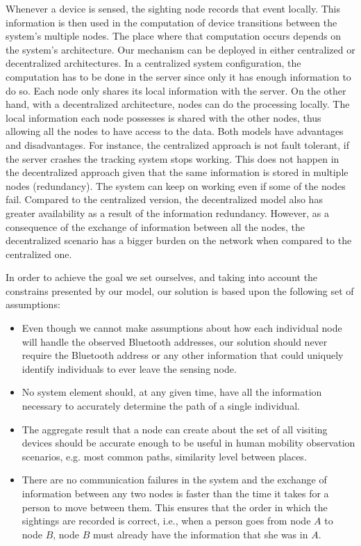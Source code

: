 Whenever a device is sensed, the sighting node records that event
locally. This information is then used in the computation of device
transitions between the system's multiple nodes. The place where that
computation occurs depends on the system's architecture. Our mechanism
can be deployed in either centralized or decentralized
architectures. In a centralized system configuration, the computation
has to be done in the server since only it has enough information to
do so. Each node only shares its local information with the server. On
the other hand, with a decentralized architecture, nodes can do the
processing locally. The local information each node possesses is
shared with the other nodes, thus allowing all the nodes to have
access to the data. Both models have advantages and
disadvantages. For instance, the centralized approach is not fault
tolerant, if the server crashes the tracking system stops
working. This does not happen in the decentralized approach given that
the same information is stored in multiple nodes (redundancy). The
system can keep on working even if some of the nodes fail. Compared to
the centralized version, the decentralized model also has greater
availability as a result of the information redundancy. However, as a
consequence of the exchange of information between all the nodes, the
decentralized scenario has a bigger burden on the network when
compared to the centralized one.


In order to achieve the goal we set ourselves, and taking into account
the constrains presented by our model, our solution is based upon the
following set of assumptions:
\begin{itemize}
\item Even though we cannot make assumptions about how each individual
  node will handle the observed Bluetooth addresses, our solution
  should never require the Bluetooth address or any other information
  that could uniquely identify individuals to ever leave the sensing
  node.
\item No system element should, at any given time, have all the
  information necessary to accurately determine the path of a single
  individual.
\item The aggregate result that a node can create about the set of all
  visiting devices should be accurate enough to be useful in human
  mobility observation scenarios, e.g. most common paths, similarity
  level between places.
\item There are no communication failures in the system and the
  exchange of information between any two nodes is faster than the
  time it takes for a person to move between them. This ensures that
  the order in which the sightings are recorded is correct, i.e., when
  a person goes from node $A$ to node $B$, node $B$ must already
  have the information that she was in $A$.
\end{itemize}

